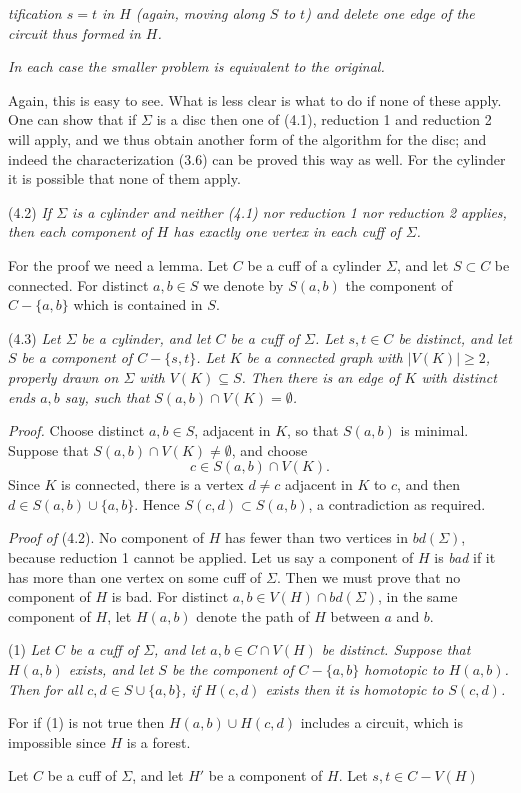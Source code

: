 \noindent \textit{tification $s = t$ in $H$ (again, moving along $S$ to $t$) and delete one edge of the circuit thus formed in $H$.}

\textit{In each case the smaller problem is equivalent to the original.}

Again, this is easy to see. What is less clear is what to do if none of these apply. One can show that if $\Sigma$ is a disc then one of (4.1), reduction 1 and reduction 2 will apply, and we thus obtain another form of the algorithm for the disc; and indeed the characterization (3.6) can be proved this way as well. For the cylinder it is possible that none of them apply.

\stmt
(4.2) \textit{If $\Sigma$ is a cylinder and neither (4.1) nor reduction 1 nor reduction 2 applies, then each component of $H$ has exactly one vertex in each cuff of $\Sigma$.}

For the proof we need a lemma. Let $C$ be a cuff of a cylinder $\Sigma$, and let $S \subset C$ be connected. For distinct $a, b \in S$ we denote by $S(a, b)$ the component of $C - \{a, b\}$ which is contained in $S$.

\stmt
(4.3) \textit{Let $\Sigma$ be a cylinder, and let $C$ be a cuff of $\Sigma$. Let $s, t \in C$ be distinct, and let $S$ be a component of $C - \{s, t\}$. Let $K$ be a connected graph with $|V(K)| \ge 2$, properly drawn on $\Sigma$ with $V(K) \subseteq S$. Then there is an edge of $K$ with distinct ends $a, b$ say, such that $S(a, b) \cap V(K) = \emptyset$.}

\textit{Proof.} Choose distinct $a, b \in S$, adjacent in $K$, so that $S(a, b)$ is minimal. Suppose that $S(a, b) \cap V(K) \ne \emptyset$, and choose
\begin{equation*}
c \in S(a, b) \cap V(K).
\end{equation*}
Since $K$ is connected, there is a vertex $d \ne c$ adjacent in $K$ to $c$, and then $d \in S(a, b) \cup \{a, b\}$. Hence $S(c, d) \subset S(a, b)$, a contradiction as required.

\textit{Proof of} (4.2). No component of $H$ has fewer than two vertices in $bd(\Sigma)$, because reduction 1 cannot be applied. Let us say a component of $H$ is \textit{bad} if it has more than one vertex on some cuff of $\Sigma$. Then we must prove that no component of $H$ is bad. For distinct $a, b \in V(H) \cap bd(\Sigma)$, in the same component of $H$, let $H(a, b)$ denote the path of $H$ between $a$ and $b$.

\hspace*{12pt}(1) \textit{Let $C$ be a cuff of $\Sigma$, and let $a, b \in C \cap V(H)$ be distinct. Suppose that $H(a, b)$ exists, and let $S$ be the component of $C - \{a, b\}$ homotopic to $H(a, b)$. Then for all $c, d \in S \cup \{a, b\}$, if $H(c, d)$ exists then it is homotopic to $S(c, d)$.}

For if (1) is not true then $H(a, b) \cup H(c, d)$ includes a circuit, which is impossible since $H$ is a forest.

Let $C$ be a cuff of $\Sigma$, and let $H'$ be a component of $H$. Let $s, t \in C - V(H)$
